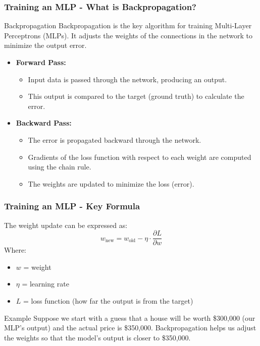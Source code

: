 \documentclass[aspectratio=169]{beamer}
\begin{document}
\begin{frame}[fragile]
    \frametitle{Training an MLP - What is Backpropagation?}
    \begin{block}{Backpropagation}
        Backpropagation is the key algorithm for training Multi-Layer Perceptrons (MLPs). 
        It adjusts the weights of the connections in the network to minimize the output error. 
    \end{block}
    \begin{itemize}
        \item \textbf{Forward Pass:}
        \begin{itemize}
            \item Input data is passed through the network, producing an output.
            \item This output is compared to the target (ground truth) to calculate the error.
        \end{itemize}
        \item \textbf{Backward Pass:}
        \begin{itemize}
            \item The error is propagated backward through the network.
            \item Gradients of the loss function with respect to each weight are computed using the chain rule.
            \item The weights are updated to minimize the loss (error).
        \end{itemize}
   \end{itemize}
\end{frame}

\begin{frame}[fragile]
    \frametitle{Training an MLP - Key Formula}
    The weight update can be expressed as:
    \begin{equation}
        w_{\text{new}} = w_{\text{old}} - \eta \cdot \frac{\partial L}{\partial w}
    \end{equation}
    Where:
    \begin{itemize}
        \item $w$ = weight
        \item $\eta$ = learning rate
        \item $L$ = loss function (how far the output is from the target)
    \end{itemize}

    \begin{block}{Example}
        Suppose we start with a guess that a house will be worth \$300,000 (our MLP's output) and the actual price is \$350,000. 
        Backpropagation helps us adjust the weights so that the model's output is closer to \$350,000.
    \end{block}
\end{frame}
\end{document}
